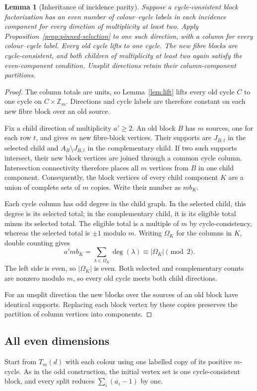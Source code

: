 \documentclass[11pt,reqno]{amsart}
\numberwithin{equation}{section}
\newtheorem{lemma}[theorem]{Lemma}
\theoremstyle{definition}
\theoremstyle{remark}
\newcommand{\Zm}{\mathbb Z_m}
\newcommand{\cO}{\Omega}
\begin{document}
\begin{lemma}[Inheritance of incidence parity]\label{lem:inherit}
Suppose a cycle-consistent block factorization has an even number of
colour--cycle labels in each incidence component for every direction of multiplicity at least two. Apply Proposition~\ref{prop:pinned-selection} to one such direction, with a column
for every colour--cycle label. Every old cycle lifts to one cycle. The new
fibre blocks are cycle-consistent, and both children of multiplicity at least two again satisfy
the even-component condition. Unsplit directions retain their column-component
partitions.
\end{lemma}
\begin{proof}
The column totals are units, so Lemma~\ref{lem:lift} lifts every old cycle $C$
to one cycle on $C\times\Zm$. Directions and cycle labels are therefore
constant on each new fibre block over an old source.

Fix a child direction of multiplicity $a'\ge2$. An old block $B$ has $m$
sources, one for each row $t$, and gives $m$ new fibre-block vertices.
Their supports are $J_{B,t}$ in the selected child and $A_B\setminus J_{B,t}$
in the complementary child. If two such supports intersect, their new block
vertices are joined through a common cycle column. Intersection connectivity
therefore places all $m$ vertices from $B$ in one child component.
Consequently, the block vertices of every child component $K$ are a union
of complete sets of $m$ copies. Write their number as $m b_K$.

Each cycle column has odd degree in the child graph. In the selected child,
this degree is its selected total; in the complementary child, it is its
eligible total minus its selected total. The eligible total is a multiple
of $m$ by cycle-consistency, whereas the selected total is $\pm1$ modulo $m$.
Writing $\cO_K$ for the columns in $K$, double counting gives
\[
 a'm b_K=\sum_{\lambda\in\cO_K}\deg(\lambda)
       \equiv |\cO_K|\pmod2.
\]
The left side is even, so $|\cO_K|$ is even. Both selected and complementary counts are
nonzero modulo $m$, so every old cycle meets both child directions.

For an unsplit direction the new blocks over the sources of an old block have
identical supports. Replacing each block vertex by these copies preserves
the partition of column vertices into components.
\end{proof}

\subsection{All even dimensions}
Start from $T_m(d)$ with each colour using one labelled copy of its
positive $m$-cycle. As in the odd construction, the initial vertex set is
one cycle-consistent block, and every split reduces
$\sum_i(a_i-1)$ by one.
\end{document}
